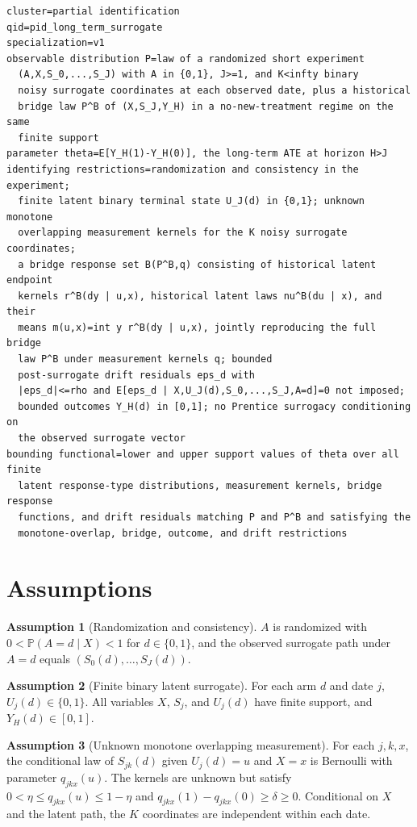 \documentclass[11pt]{article}
\renewcommand{\Pr}{\mathbb{P}}
\theoremstyle{definition}
\newtheorem{assumption}{Assumption}
\theoremstyle{plain}
\theoremstyle{remark}
\begin{document}
\begin{verbatim}
cluster=partial identification
qid=pid_long_term_surrogate
specialization=v1
observable distribution P=law of a randomized short experiment
  (A,X,S_0,...,S_J) with A in {0,1}, J>=1, and K<infty binary
  noisy surrogate coordinates at each observed date, plus a historical
  bridge law P^B of (X,S_J,Y_H) in a no-new-treatment regime on the same
  finite support
parameter theta=E[Y_H(1)-Y_H(0)], the long-term ATE at horizon H>J
identifying restrictions=randomization and consistency in the experiment;
  finite latent binary terminal state U_J(d) in {0,1}; unknown monotone
  overlapping measurement kernels for the K noisy surrogate coordinates;
  a bridge response set B(P^B,q) consisting of historical latent endpoint
  kernels r^B(dy | u,x), historical latent laws nu^B(du | x), and their
  means m(u,x)=int y r^B(dy | u,x), jointly reproducing the full bridge
  law P^B under measurement kernels q; bounded
  post-surrogate drift residuals eps_d with
  |eps_d|<=rho and E[eps_d | X,U_J(d),S_0,...,S_J,A=d]=0 not imposed;
  bounded outcomes Y_H(d) in [0,1]; no Prentice surrogacy conditioning on
  the observed surrogate vector
bounding functional=lower and upper support values of theta over all finite
  latent response-type distributions, measurement kernels, bridge response
  functions, and drift residuals matching P and P^B and satisfying the
  monotone-overlap, bridge, outcome, and drift restrictions
\end{verbatim}

\section{Assumptions}
\begin{assumption}[Randomization and consistency]\label{ass:randomization}
\(A\) is randomized with \(0<\Pr(A=d\mid X)<1\) for \(d\in\{0,1\}\), and the observed surrogate path under \(A=d\) equals \((S_0(d),\ldots,S_J(d))\).
\end{assumption}

\begin{assumption}[Finite binary latent surrogate]\label{ass:finite-latent}
For each arm \(d\) and date \(j\), \(U_j(d)\in\{0,1\}\).  All variables \(X\), \(S_j\), and \(U_j(d)\) have finite support, and \(Y_H(d)\in[0,1]\).
\end{assumption}

\begin{assumption}[Unknown monotone overlapping measurement]\label{ass:measurement}
For each \(j,k,x\), the conditional law of \(S_{jk}(d)\) given \(U_j(d)=u\) and \(X=x\) is Bernoulli with parameter \(q_{jkx}(u)\).  The kernels are unknown but satisfy \(0<\eta\le q_{jkx}(u)\le1-\eta\) and \(q_{jkx}(1)-q_{jkx}(0)\ge\delta\ge0\).  Conditional on \(X\) and the latent path, the \(K\) coordinates are independent within each date.
\end{assumption}
\end{document}
